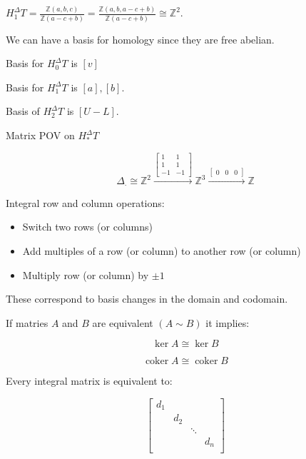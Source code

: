 \documentclass{article}
\theoremstyle{definition}
\begin{document}
    \(H_1^\Delta T = \frac{\mathbb{Z}(a,b,c)}{\mathbb{Z}(a-c+b)} = \frac{\mathbb{Z}(a,b,a-c+b)}{\mathbb{Z}(a-c+b)} \cong \mathbb{Z}^2\).

    We can have a basis for homology since they are free abelian.

    Basis for \(H_0^\Delta T\) is \([v]\)
    
    Basis for \(H_1^\Delta T\) is \([a],[b]\).
    
    Basis of \(H_2^\Delta T\) is \([U-L]\).

    Matrix POV on \(H_{\ast}^\Delta T\)

    \[
        \Delta_\cdot \cong \mathbb{Z}^2 \xrightarrow{\begin{bmatrix}
            1 & 1 \\
            1 & 1 \\
            -1 & -1
        \end{bmatrix} } \mathbb{Z}^3 \xrightarrow{\begin{bmatrix}
            0 & 0 & 0
        \end{bmatrix}} \mathbb{Z}
    \]

    Integral row and column operations:

    \begin{itemize}
        \item Switch two rows (or columns)
        \item Add multiples of a row (or column) to another row (or column)
        \item Multiply row (or column) by \(\pm 1\) 
    \end{itemize} 

    These correspond to basis changes in the domain and codomain.

    If matries \(A\) and \(B\) are equivalent \((A \sim B)\) it implies:

    \[
        \ker A \cong \ker B
    \]

    \[
        \operatorname{coker}  A \cong \operatorname{coker} B
    \]

    Every integral matrix is equivalent to:

    \[
        \begin{bmatrix}
            d_1 &  &  &  \\
             & d_2 &  &  \\
             &  & \ddots &  \\
             &  &  & d_n \\
        \end{bmatrix} 
    \]
\end{document}
